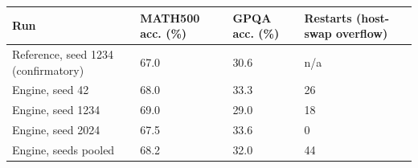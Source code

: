 \begin{tabular}{llll}
\toprule
Run & MATH500 acc. (\%) & GPQA acc. (\%) & Restarts (host-swap overflow) \\
\midrule
Reference, seed 1234 (confirmatory) & 67.0 & 30.6 & n/a \\
Engine, seed 42 & 68.0 & 33.3 & 26 \\
Engine, seed 1234 & 69.0 & 29.0 & 18 \\
Engine, seed 2024 & 67.5 & 33.6 & 0 \\
Engine, seeds pooled & 68.2 & 32.0 & 44 \\
\bottomrule
\end{tabular}
